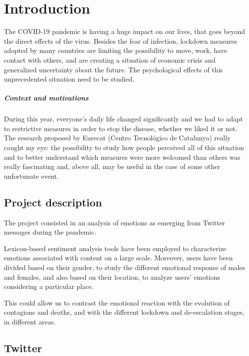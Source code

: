 \chapter{Introduction}
\label{cha:intro}

The COVID-19 pandemic is having a huge impact on our lives, that goes beyond the direct effects of the virus. Besides the fear of infection, lockdown measures adopted by many countries are limiting the possibility to move, work, have contact with others, and are creating a situation of economic crisis and generalized uncertainty about the future. The psychological effects of this unprecedented situation need to be studied.

\paragraph{Context and motivations}

During this year, everyone's daily life changed significantly and we had to adapt to restrictive measures in order to stop the disease, whether we liked it or not. The research proposed by Eurecat (Centro Tecnológico de Catalunya) really caught my eye: the possibility to study how people perceived all of this situation and to better understand which measures were more welcomed than others was really fascinating and, above all, may be useful in the case of some other unfortunate event.

\section{Project description}
\label{sec:project}

The project consisted in an analysis of emotions as emerging from Twitter messages during the pandemic.

Lexicon-based sentiment analysis tools have been employed to characterize emotions associated with content on a large scale. Moreover, users have been divided based on their gender, to study the different emotional response of males and females, and also based on their location, to analyze users' emotions considering a particular place. 

This could allow us to contrast the emotional reaction with the evolution of contagions and deaths, and with the different lockdown and de-escalation stages, in different areas.

\section{Twitter}
\label{sec:twitter}

